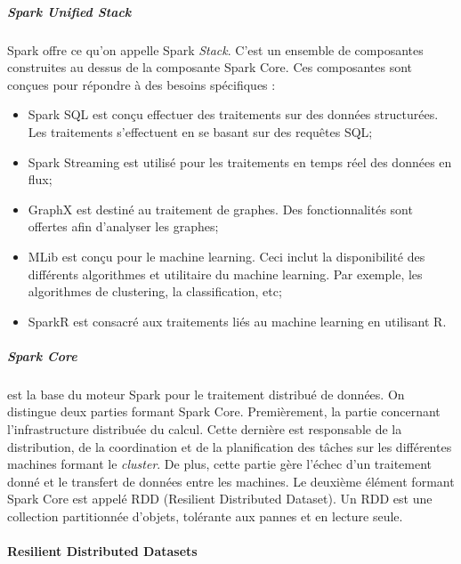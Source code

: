 \subparagraph{Spark Unified Stack} \label{Spark Uniffied-Stack}Spark offre ce qu'on appelle Spark \textit{Stack}. C'est un ensemble de composantes construites au dessus de la composante Spark Core.  Ces composantes sont conçues pour répondre à des besoins spécifiques :
\begin{itemize}
	\item Spark SQL  est conçu effectuer des traitements sur des données structurées. Les traitements s'effectuent en se basant sur des requêtes SQL;
	\item Spark Streaming est utilisé pour les traitements    en temps réel des données en flux;
	\item  GraphX est destiné au traitement de graphes. Des fonctionnalités sont offertes afin d'analyser les graphes;
	\item MLib est conçu pour le machine learning. Ceci inclut la disponibilité des différents algorithmes et utilitaire du machine learning. Par exemple, les algorithmes de clustering, la classification, etc;
	\item SparkR est consacré aux traitements liés au machine learning en utilisant  R.
\end{itemize}
\subparagraph{Spark Core} est la base du moteur Spark pour le traitement distribué de données.  On distingue deux parties formant Spark Core. Premièrement, la partie concernant l'infrastructure distribuée du calcul. Cette dernière est responsable de la distribution, de la coordination et de la planification des tâches  sur les différentes machines formant le \textit{cluster}. De plus, cette partie gère l'échec d'un traitement donné et le transfert de données entre les machines. Le deuxième élément formant Spark Core est appelé RDD (Resilient Distributed Dataset). Un RDD est une collection partitionnée d'objets, tolérante aux pannes et en lecture seule. 

\paragraph{Resilient Distributed Datasets}\label{rdd-presentation} ~


